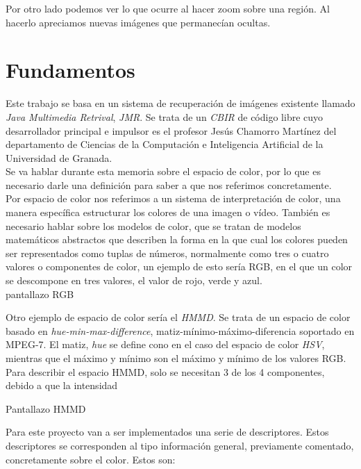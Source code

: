 Por otro lado podemos ver lo que ocurre al hacer zoom sobre una región. Al hacerlo apreciamos nuevas imágenes que permanecían ocultas.\\


\section{Fundamentos}

Este trabajo se basa en un sistema de recuperación de imágenes existente llamado \textit{Java Multimedia Retrival}, \textit{JMR}. Se trata de un \textit{CBIR} de código libre cuyo desarrollador principal e impulsor es el profesor Jesús Chamorro Martínez del departamento de Ciencias de la Computación e Inteligencia Artificial de la Universidad de Granada.\\

Se va hablar durante esta memoria sobre el espacio de color, por lo que es necesario darle una definición para saber a que nos referimos concretamente.\\

Por espacio de color nos referimos a un sistema de interpretación de color, una manera específica estructurar los colores de una imagen o vídeo. También es necesario hablar sobre los modelos de color, que se tratan de modelos matemáticos abstractos que describen la forma en la que cual los colores pueden ser representados como tuplas de números, normalmente como tres o cuatro valores o componentes de color, un ejemplo de esto sería RGB, en el que un color se descompone en tres valores, el valor de rojo, verde y azul.\\

pantallazo RGB

Otro ejemplo de espacio de color sería el \textit{HMMD}. Se trata de un espacio de color basado en \textit{hue-min-max-difference}, matiz-mínimo-máximo-diferencia soportado en MPEG-7. El matiz, \textit{hue} se define cono en el caso del espacio de color \textit{HSV}, mientras que el máximo y mínimo son el máximo y mínimo de los valores RGB. Para describir el espacio HMMD, solo se necesitan 3 de los 4 componentes, debido a que la intensidad



Pantallazo HMMD

Para este proyecto van a ser implementados una serie de descriptores. Estos descriptores se corresponden al tipo información general, previamente comentado, concretamente sobre el color. Estos son:


